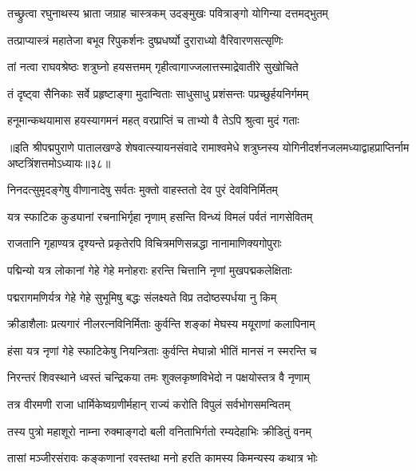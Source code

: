 \twolineshloka
{तच्छ्रुत्वा रघुनाथस्य भ्राता जग्राह चास्त्रकम्}
{उदङ्मुखः पवित्राङ्गो योगिन्या दत्तमद्भुतम्}%

\twolineshloka
{तत्प्राप्यास्त्रं महातेजा बभूव रिपुकर्शनः}
{दुष्प्रधर्ष्यो दुराराध्यो वैरिवारणसत्सृणिः}%

\twolineshloka
{तां नत्वा राघवश्रेष्ठः शत्रुघ्नो हयसत्तमम्}
{गृहीत्वागाज्जलात्तस्माद्रेवातीरे सुखोचिते}%

\twolineshloka
{तं दृष्ट्वा सैनिकाः सर्वे प्रहृष्टाङ्गा मुदान्विताः}
{साधुसाधु प्रशंसन्तः पप्रच्छुर्हयनिर्गमम्}%

\twolineshloka
{हनूमान्कथयामास हयस्यागमनं महत्}
{वरप्राप्तिं च ताभ्यो वै तेऽपि श्रुत्वा मुदं गताः}%

{॥इति श्रीपद्मपुराणे पातालखण्डे शेषवात्स्यायनसंवादे रामाश्वमेधे शत्रुघ्नस्य योगिनीदर्शनजलमध्याद्वाहप्राप्तिर्नाम अष्टत्रिंशत्तमोऽध्यायः॥३८॥}

\resetShloka


\twolineshloka
{निनदत्सुमृदङ्गेषु वीणानादेषु सर्वतः}
{मुक्तो वाहस्ततो देव पुरं देवविनिर्मितम्}%

\twolineshloka
{यत्र स्फाटिक कुड्यानां रचनाभिर्गृहा नृणाम्}
{हसन्ति विन्ध्यं विमलं पर्वतं नागसेवितम्}%

\twolineshloka
{राजतानि गृहाण्यत्र दृश्यन्ते प्रकृतेरपि}
{विचित्रमणिसन्नद्धा नानामाणिक्यगोपुराः}%

\twolineshloka
{पद्मिन्यो यत्र लोकानां गेहे गेहे मनोहराः}
{हरन्ति चित्तानि नृणां मुखपद्मकलेक्षिताः}%

\twolineshloka
{पद्मरागमणिर्यत्र गेहे गेहे सुभूमिषु}
{बद्धः संलक्ष्यते विप्र तदोष्ठस्पर्धया नु किम्}%

\twolineshloka
{क्रीडाशैलाः प्रत्यगारं नीलरत्नविनिर्मिताः}
{कुर्वन्ति शङ्कां मेघस्य मयूराणां कलापिनाम्}%

\twolineshloka
{हंसा यत्र नृणां गेहे स्फाटिकेषु नियन्त्रिताः}
{कुर्वन्ति मेघान्नो भीतिं मानसं न स्मरन्ति च}%

\twolineshloka
{निरन्तरं शिवस्थाने ध्वस्तं चन्द्रिकया तमः}
{शुक्लकृष्णविभेदो न पक्षयोस्तत्र वै नृणाम्}%

\twolineshloka
{तत्र वीरमणी राजा धार्मिकेष्वग्रणीर्महान्}
{राज्यं करोति विपुलं सर्वभोगसमन्वितम्}%

\twolineshloka
{तस्य पुत्रो महाशूरो नाम्ना रुक्माङ्गदो बली}
{वनिताभिर्गतो रम्यदेहाभिः क्रीडितुं वनम्}%

\twolineshloka
{तासां मञ्जीरसंरावः कङ्कणानां रवस्तथा}
{मनो हरति कामस्य किमन्यस्य कथात्र भोः}%

